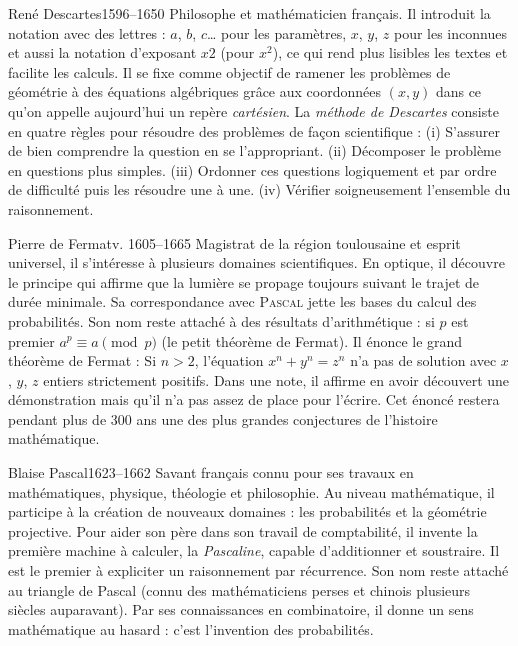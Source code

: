 \documentclass[10pt,class=article,crop=false]{standalone}
\begin{document}
\begin{multicols}{2}
\begin{biographie}{René Descartes}{1596--1650}
Philosophe et mathématicien français.
Il introduit la notation avec des lettres : $a$, $b$, $c$\ldots{} pour les paramètres, $x$, $y$, $z$ pour les inconnues et aussi la notation d'exposant $x2$ (pour $x^2$), ce qui rend plus lisibles les textes et facilite les calculs. 
Il se fixe comme objectif de ramener les problèmes de géométrie à des équations algébriques grâce aux coordonnées $(x,y)$ dans ce qu'on appelle aujourd'hui un repère \emph{cartésien}.
La \emph{méthode de Descartes} consiste en quatre règles pour résoudre des problèmes de façon scientifique :
(i) S'assurer de bien comprendre la question en se l'appropriant.
(ii) Décomposer le problème en questions plus simples.
(iii) Ordonner ces questions logiquement et par ordre de difficulté puis les résoudre une à une.
(iv) Vérifier soigneusement l'ensemble du raisonnement.
\end{biographie}


\begin{biographie}{Pierre de Fermat}{v. 1605--1665}
Magistrat de la région toulousaine et esprit universel, il s’intéresse à plusieurs domaines scientifiques. En optique, il découvre le principe
qui affirme que la lumière se propage toujours suivant le trajet de durée minimale.  Sa correspondance avec \textsc{Pascal} jette les bases du calcul des probabilités. 
Son nom reste attaché à des résultats d'arithmétique : \og{}si $p$ est premier $a^p \equiv a \pmod{p}$\fg{} (le petit théorème de Fermat). Il énonce le \og{}grand théorème de Fermat\fg{} : \og{}Si $n>2$, l'équation $x^n + y^n = z^n$ n'a pas de solution avec $x$, $y$, $z$ entiers strictement positifs.\fg{} Dans une note, il affirme en avoir découvert une démonstration mais qu'il n'a pas assez de place pour l'écrire. Cet énoncé restera pendant plus de 300 ans une des plus grandes conjectures de l'histoire mathématique.
\end{biographie}


\begin{biographie}{Blaise Pascal}{1623--1662}
Savant français connu pour ses travaux en mathématiques, physique, théologie et philosophie.
Au niveau mathématique, il participe à la création de nouveaux domaines : les probabilités et la géométrie projective. Pour aider son père dans son travail de comptabilité, il invente la première machine à calculer, la \emph{Pascaline}, capable d'additionner et soustraire. Il est le premier à expliciter un raisonnement par récurrence.
Son nom reste attaché au triangle de Pascal (connu des mathématiciens perses et chinois plusieurs siècles auparavant). Par ses connaissances en combinatoire, il donne un sens mathématique au hasard : c'est l'invention des probabilités.
\end{biographie}



\end{multicols}
\end{document}
